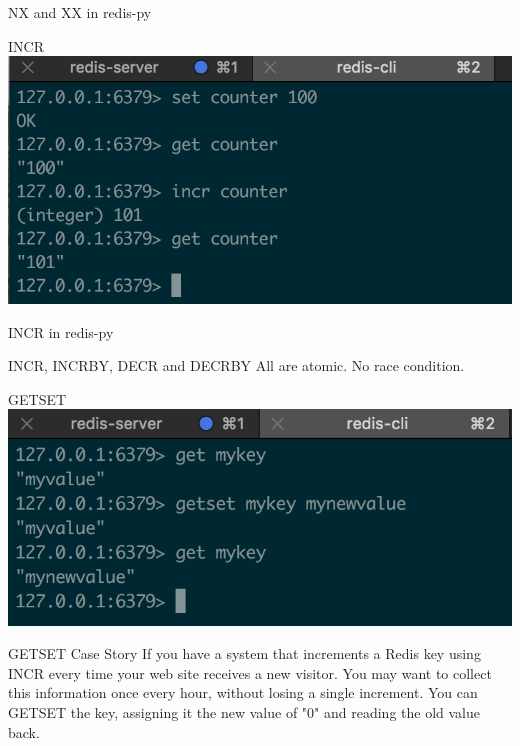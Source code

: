 \documentclass[10pt]{beamer}
\begin{document}
\begin{frame}[fragile]{NX and XX in redis-py}
\end{frame}


\begin{frame}[fragile]{INCR}
  \includegraphics[scale=0.9]{img/incr}
\end{frame}

\begin{frame}[fragile]{INCR in redis-py}
\end{frame}


\begin{frame}[fragile]{INCR, INCRBY, DECR and DECRBY}
    All are atomic. No race condition.
\end{frame}

\begin{frame}[fragile]{GETSET}
    \includegraphics[scale=0.9]{img/getset}
\end{frame}

\begin{frame}[fragile]{GETSET Case Story}
  If you have a system that increments a Redis key using INCR every time your
  web site receives a new visitor. You may want to collect this information
  once every hour, without losing a single increment. You can GETSET the key,
  assigning it the new value of "0" and reading the old value back.
\end{frame}
\end{document}
